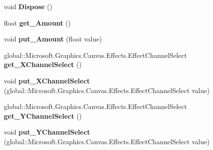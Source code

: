 \begin{DoxyCompactItemize}
void {\bfseries Dispose} ()
\item 
\mbox{\label{class_microsoft_1_1_graphics_1_1_canvas_1_1_effects_1_1_displacement_map_effect_ab9cf484fc72d3724bf8b3090cfadbdc0}} 
float {\bfseries get\+\_\+\+Amount} ()
\item 
\mbox{\label{class_microsoft_1_1_graphics_1_1_canvas_1_1_effects_1_1_displacement_map_effect_a778035a283ef8ab94cb70d3718c04523}} 
void {\bfseries put\+\_\+\+Amount} (float value)
\item 
\mbox{\label{class_microsoft_1_1_graphics_1_1_canvas_1_1_effects_1_1_displacement_map_effect_a9de6395612f22b140d32e3ca061cd2a5}} 
global\+::\+Microsoft.\+Graphics.\+Canvas.\+Effects.\+Effect\+Channel\+Select {\bfseries get\+\_\+\+X\+Channel\+Select} ()
\item 
\mbox{\label{class_microsoft_1_1_graphics_1_1_canvas_1_1_effects_1_1_displacement_map_effect_a17232b9afecc3a3387aba9aa88381baf}} 
void {\bfseries put\+\_\+\+X\+Channel\+Select} (global\+::\+Microsoft.\+Graphics.\+Canvas.\+Effects.\+Effect\+Channel\+Select value)
\item 
\mbox{\label{class_microsoft_1_1_graphics_1_1_canvas_1_1_effects_1_1_displacement_map_effect_a054ea7ca343451632990c0ba5745cb36}} 
global\+::\+Microsoft.\+Graphics.\+Canvas.\+Effects.\+Effect\+Channel\+Select {\bfseries get\+\_\+\+Y\+Channel\+Select} ()
\item 
\mbox{\label{class_microsoft_1_1_graphics_1_1_canvas_1_1_effects_1_1_displacement_map_effect_a16f640070ff4f567c8c7c530557b8c10}} 
void {\bfseries put\+\_\+\+Y\+Channel\+Select} (global\+::\+Microsoft.\+Graphics.\+Canvas.\+Effects.\+Effect\+Channel\+Select value)
\item 
\mbox{\label{class_microsoft_1_1_graphics_1_1_canvas_1_1_effects_1_1_displacement_map_effect_af69fbee08f58e40ff331229945a58a92}} 

\end{DoxyCompactItemize}
